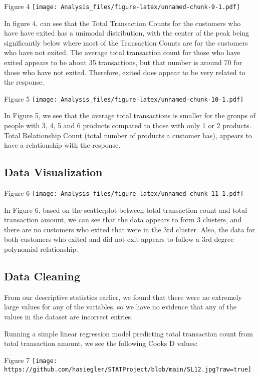 \documentclass[
]{article}
\begin{document}
Figure 4
\texttt{[image: Analysis\_files/figure-latex/unnamed-chunk-9-1.pdf]}

In figure 4, can see that the Total Transaction Counts for the customers
who have have exited has a unimodal distribution, with the center of the
peak being significantly below where most of the Transaction Counts are
for the customers who have not exited. The average total transaction
count for those who have exited appears to be about 35 transactions, but
that number is around 70 for those who have not exited. Therefore,
exited does appear to be very related to the response.

Figure 5
\texttt{[image: Analysis\_files/figure-latex/unnamed-chunk-10-1.pdf]}

In Figure 5, we see that the average total transactions is smaller for
the groups of people with 3, 4, 5 and 6 products compared to those with
only 1 or 2 products. Total Relationship Count (total number of products
a customer has), appears to have a relationship with the response.

\hypertarget{data-visualization}{%
\subsection{Data Visualization}\label{data-visualization}}

Figure 6
\texttt{[image: Analysis\_files/figure-latex/unnamed-chunk-11-1.pdf]}

In Figure 6, based on the scatterplot between total transaction count
and total transaction amount, we can see that the data appears to form 3
clusters, and there are no customers who exited that were in the 3rd
cluster. Also, the data for both customers who exited and did not exit
appears to follow a 3rd degree polynomial relationship.

\hypertarget{data-cleaning}{%
\subsection{Data Cleaning}\label{data-cleaning}}

From our descriptive statistics earlier, we found that there were no
extremely large values for any of the variables, so we have no evidence
that any of the values in the dataset are incorrect entries.

Running a simple linear regression model predicting total transaction
count from total transaction amount, we see the following Cooks D
values:

Figure 7
\texttt{[image: https://github.com/hasiegler/STATProject/blob/main/SL12.jpg?raw=true]}
\end{document}
